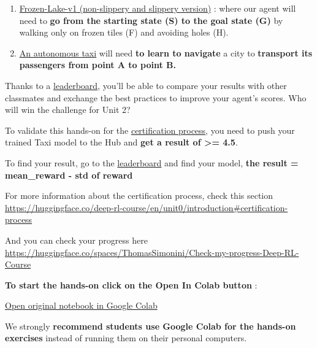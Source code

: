 \documentclass[11pt,a4paper]{article}
\begin{document}
\begin{enumerate}
\def\labelenumi{\arabic{enumi}.}
\tightlist
\item
  \href{https://gymnasium.farama.org/environments/toy_text/frozen_lake/}{Frozen-Lake-v1 (non-slippery and slippery version)} : where our agent will need to \textbf{go from the starting state (S) to the goal state (G)} by walking only on frozen tiles (F) and avoiding holes (H).
\item
  \href{https://gymnasium.farama.org/environments/toy_text/taxi/}{An autonomous taxi} will need \textbf{to learn to navigate} a city to \textbf{transport its passengers from point A to point B.}
\end{enumerate}


Thanks to a \href{https://huggingface.co/spaces/huggingface-projects/Deep-Reinforcement-Learning-Leaderboard}{leaderboard}, you'll be able to compare your results with other classmates and exchange the best practices to improve your agent's scores. Who will win the challenge for Unit 2?

To validate this hands-on for the \href{https://huggingface.co/deep-rl-course/en/unit0/introduction\#certification-process}{certification process}, you need to push your trained Taxi model to the Hub and \textbf{get a result of \textgreater= 4.5}.

To find your result, go to the \href{https://huggingface.co/spaces/huggingface-projects/Deep-Reinforcement-Learning-Leaderboard}{leaderboard} and find your model, \textbf{the result = mean\_reward - std of reward}

For more information about the certification process, check this section \url{https://huggingface.co/deep-rl-course/en/unit0/introduction\#certification-process}

And you can check your progress here \url{https://huggingface.co/spaces/ThomasSimonini/Check-my-progress-Deep-RL-Course}

\textbf{To start the hands-on click on the Open In Colab button} :

\href{https://colab.research.google.com/github/huggingface/deep-rl-class/blob/master/notebooks/unit2/unit2.ipynb}{Open original notebook in Google Colab}

We strongly \textbf{recommend students use Google Colab for the hands-on exercises} instead of running them on their personal computers.
\end{document}
